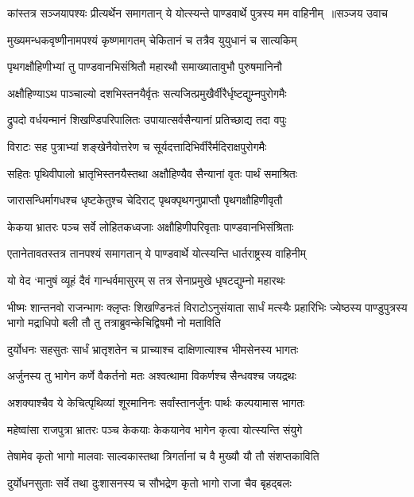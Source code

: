 \threelineshloka
{कांस्तत्र सञ्जयापश्यः प्रीत्यर्थेन समागतान्}
{ये योत्स्यन्ते पाण्डवार्थे पुत्रस्य मम वाहिनीम् ॥सञ्जय उवाच}
{}


\twolineshloka
{मुख्यमन्धकवृष्णीनामपश्यं कृष्णमागतम्}
{चेकितानं च तत्रैव युयुधानं च सात्यकिम्}


\twolineshloka
{पृथगक्षौहिणीभ्यां तु पाण्डवानभिसंश्रितौ}
{महारथौ समाख्यातावुभौ पुरुषमानिनौ}


\threelineshloka
{अक्षौहिण्याऽथ पाञ्चाल्यो दशभिस्तनयैर्वृतः}
{सत्यजित्प्रमुखैर्वीरैर्धृष्टद्युम्नपुरोगमैः}
{}


\twolineshloka
{द्रुपदो वर्धयन्मानं शिखण्डिपरिपालितः}
{उपायात्सर्वसैन्यानां प्रतिच्छाद्य तदा वपुः}


\twolineshloka
{विराटः सह पुत्राभ्यां शङ्खेनैवोत्तरेण च}
{सूर्यदत्तादिभिर्वीरैर्मदिराक्षपुरोगमैः}


\twolineshloka
{सहितः पृथिवीपालो भ्रातृभिस्तनयैस्तथा}
{अक्षौहिण्यैव सैन्यानां वृतः पार्थं समाश्रितः}


\twolineshloka
{जारासन्धिर्मागधश्च धृष्टकेतुश्च चेदिराट्}
{पृथक्पृथगनुप्राप्तौ पृथगक्षौहिणीवृतौ}


\twolineshloka
{केकया भ्रातरः पञ्च सर्वे लोहितकध्वजाः}
{अक्षौहिणीपरिवृताः पाण्डवानभिसंश्रिताः}


\twolineshloka
{एतानेतावतस्तत्र तानपश्यं समागतान्}
{ये पाण्डवार्थे योत्स्यन्ति धार्तराष्ट्रस्य वाहिनीम्}


\twolineshloka
{यो वेद `मानुषं व्यूहं दैवं गान्धर्वमासुरम्}
{स तत्र सेनाप्रमुखे धृषटद्युम्नो महारथः}


भीष्मः शान्तनवो राजन्भागः क्लृप्तः शिखण्डिनःतं विराटोऽनुसंयाता सार्धं मत्स्यैः प्रहारिभिः
\twolineshloka
{ज्येष्ठस्य पाण्डुपुत्रस्य भागो मद्राधिपो बली}
{तौ तु तत्राब्रुवन्केचिद्विषमौ नो मताविति}


\twolineshloka
{दुर्योधनः सहसुतः सार्धं भ्रातृशतेन च}
{प्राच्याश्च दाक्षिणात्याश्च भीमसेनस्य भागतः}


\twolineshloka
{अर्जुनस्य तु भागेन कर्णे वैकर्तनो मतः}
{अश्वत्थामा विकर्णश्च सैन्धवश्च जयद्रथः}


\twolineshloka
{अशक्याश्चैव ये केचित्पृथिव्यां शूरमानिनः}
{सर्वांस्तानर्जुनः पार्थः कल्पयामास भागतः}


\twolineshloka
{महेष्वांसा राजपुत्रा भ्रातरः पञ्च केकयाः}
{केकयानेव भागेन कृत्वा योत्स्यन्ति संयुगे}


\twolineshloka
{तेषामेव कृतो भागो मालवाः साल्वकास्तथा}
{त्रिगर्तानां च वै मुख्यौ यौ तौ संशप्तकाविति}


\twolineshloka
{दुर्योधनसुताः सर्वे तथा दुःशासनस्य च}
{सौभद्रेण कृतो भागो राजा चैव बृहद्बलः}


